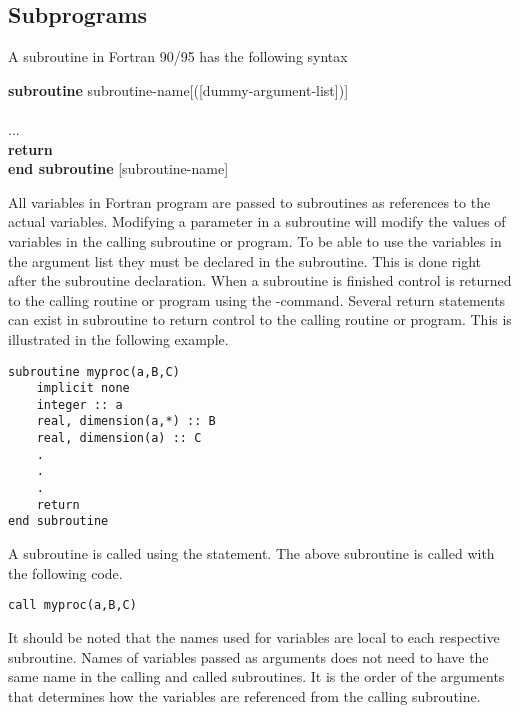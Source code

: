 \subsection{Subprograms}

A subroutine in Fortran 90/95 has the following syntax

\begin{fsyntax}
\textbf{subroutine} subroutine-name[([dummy-argument-list])]\\
\\
\ftab ...\\
\ftab \textbf{return}\\
\textbf{end subroutine} [subroutine-name]
\end{fsyntax}

All variables in Fortran program are passed to subroutines as references to the actual variables. Modifying a parameter in a subroutine will modify the values of variables in the calling subroutine or program. To be able to use the variables in the argument list they must be declared in the subroutine. This is done right after the subroutine declaration. When a subroutine is finished control is returned to the calling routine or program using the -command. Several return statements can exist in subroutine to return control to the calling routine or program. This is illustrated in the following example.

\begin{lstlisting}
subroutine myproc(a,B,C)
    implicit none
    integer :: a
    real, dimension(a,*) :: B
    real, dimension(a) :: C
    .
    .
    .
    return
end subroutine
\end{lstlisting}

A subroutine is called using the  statement. The above subroutine is called with the following code.

\begin{lstlisting}
call myproc(a,B,C)
\end{lstlisting}

It should be noted that the names used for variables are local to each respective subroutine. Names of variables passed as arguments does not need to have the same name in the calling and called subroutines. It is the order of the arguments that determines how the variables are referenced from the calling subroutine.

